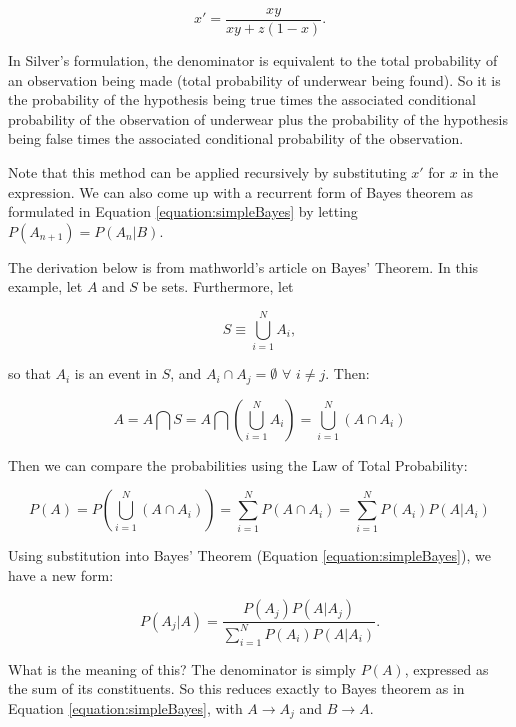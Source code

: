 \begin{equation}
x' = \frac{xy}{xy+z(1-x)}.
\end{equation}

In Silver's formulation, the denominator is equivalent to the total probability of an observation being made (total probability of underwear being found). So it is the probability of the hypothesis being true times the associated conditional probability of the observation of underwear plus the probability of the hypothesis being false times the associated conditional probability of the observation.

Note that this method can be applied recursively by substituting $x'$ for $x$ in the expression. We can also come up with a recurrent form of Bayes theorem as formulated in Equation \ref{equation:simpleBayes} by letting $P(A_{n+1}) = P(A_{n}|B)$.

The derivation below is from mathworld's article on Bayes' Theorem. In this example, let $A$ and $S$ be sets. Furthermore, let 

\begin{equation}
S \equiv \bigcup_{i=1}^{N} A_{i},
\end{equation}

so that $A_{i}$ is an event in $S$, and $A_{i} \cap A_{j} = \emptyset$ $\forall$ $i \not= j$. Then:

\begin{equation}
A = A \bigcap S = A \bigcap ( \bigcup_{i=1}^{N} A_{i} ) = \bigcup_{i=1}^{N} (A \cap A_{i})
\end{equation}

Then we can compare the probabilities using the Law of Total Probability:

\begin{equation}
P(A) = P(\bigcup_{i=1}^{N} (A \cap A_{i}))=\sum_{i=1}^{N} P(A \cap A_{i}) = \sum_{i=1}^{N} P(A_{i}) P(A|A_{i})
\end{equation}

Using substitution into Bayes' Theorem (Equation \ref{equation:simpleBayes}), we have a new form:

\begin{equation}
P(A_{j} | A) = \frac{P(A_{j}) P(A | A_{j})}{\sum_{i=1}^{N} P(A_{i}) P(A|A_{i})}.
\end{equation}

What is the meaning of this? The denominator is simply $P(A)$, expressed as the sum of its constituents. So this reduces exactly to Bayes theorem as in Equation \ref{equation:simpleBayes}, with $A \rightarrow A_{j}$ and $B \rightarrow A$.

